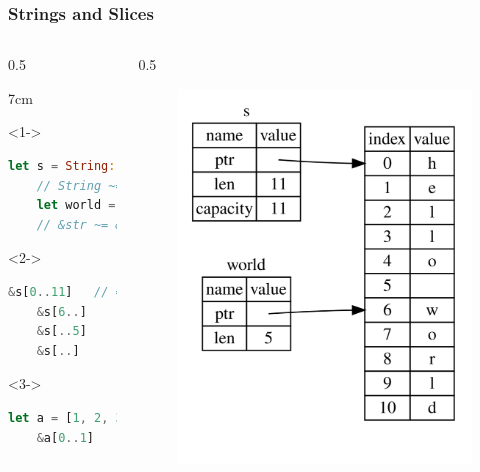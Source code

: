 \begin{frame}[fragile]
    \frametitle{Strings and Slices}

    \begin{columns}
    \begin{column}{0.5\textwidth}

    \begin{overlayarea}{\linewidth}{7cm}
    \begin{onlyenv}<1->
    \begin{lstlisting}[language=rust]
    let s = String::from("hello world");
    // String ~= Vec<char>
    let world = &s[6..11];
    // &str ~= &[char]
    \end{lstlisting}
    \end{onlyenv}

    \begin{onlyenv}<2->
    \begin{lstlisting}[language=rust]
    &s[0..11]   // = "hello world"
    &s[6..]     // = "world"
    &s[..5]     // = "hello"
    &s[..]      // = "hello world"
    \end{lstlisting}
    \end{onlyenv}

    \begin{onlyenv}<3->
    \begin{lstlisting}[language=rust]
    let a = [1, 2, 3];
    &a[0..1]    // = [1]
    \end{lstlisting}
    \end{onlyenv}

    \end{overlayarea}
    \end{column}

    \begin{column}{0.5\textwidth}
        \begin{figure}
            \includegraphics[width=.7\textwidth]{img/string-slice.pdf}
        \end{figure}
    \end{column}
    \end{columns}
\end{frame}


